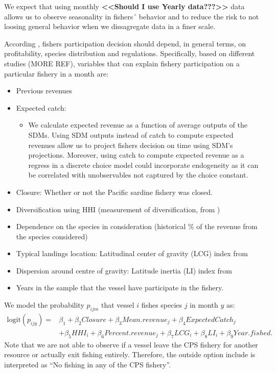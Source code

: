 \documentclass[
]{article}
\providecommand{\tightlist}{%
  \setlength{\itemsep}{0pt}\setlength{\parskip}{0pt}}
\begin{document}
We expect that using monthly \textbf{\textless\textless Should I use
Yearly data???\textgreater\textgreater{}} data allows us to observe
seasonality in fishers´ behavior and to reduce the risk to not loosing
general behavior when we dissagregate data in a finer scale.

According \citet{richerson2017}, fishers participation decision should
depend, in general terms, on profitability, species distribution and
regulations. Specifically, based on different studies
\citep{richerson2017} (MORE REF), variables that can explain fishery
participation on a particular fishery in a month are:

\begin{itemize}
\tightlist
\item
  Previous revenues
\item
  Expected catch:

  \begin{itemize}
  \tightlist
  \item
    We calculate expected revenue as a function of average outputs of
    the SDMs. Using SDM outputs instead of catch to compute expected
    revenues allow us to project fishers decision on time using SDM's
    projections. Moreover, using catch to compute expected revenue as a
    regress in a discrete choice model could incorporate endogeneity as
    it can be correlated with unobservables not captured by the choice
    constant.
  \end{itemize}
\item
  Closure: Whether or not the Pacific sardine fishery was closed.
\item
  Diversification using HHI (measurement of diversification, from
  \citet{richerson2017})
\item
  Dependence on the species in consideration (historical \% of the
  revenue from the species considered)
\item
  Typical landings location: Latitudinal center of gravity (LCG) index
  from \citep{richerson2017}
\item
  Dispersion around centre of gravity: Latitude inertia (LI) index from
  \citep{richerson2017}
\item
  Years in the sample that the vessel have participate in the fishery.
\end{itemize}

We model the probability \(p_{ijm}\) that vessel \(i\) fishes species
\(j\) in month \(y\) as: \begin{align*}
\text{logit}(p_{ijy}) = & \beta_1 + \beta_2  Closure + \beta_3 Mean.revenue_j + \beta_4 ExpectedCatch_j \\
& + \beta_5 HHI_i + \beta_6 Percent.revenue_j + \beta_7 LCG_i + \beta_8 LI_i + \beta_9 Year.fished. 
\end{align*} Note that we are not able to observe if a vessel leave the
CPS fishery for another resource or actually exit fishing entirely.
Therefore, the outside option include is interpreted as ``No fishing in
any of the CPS fishery''.
\end{document}
